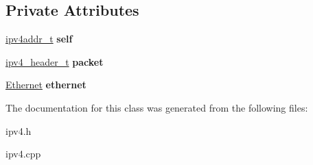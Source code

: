 \subsection*{Private Attributes}
\begin{DoxyCompactItemize}
\item 
\mbox{\label{classIPv4_a4288e410994ae3a739dc7e2a6aedeb90}} 
\mbox{\hyperlink{unionipv4addr__t}{ipv4addr\+\_\+t}} {\bfseries self}
\item 
\mbox{\label{classIPv4_abc94da213c7f9b909a96821315230fbc}} 
\mbox{\hyperlink{structipv4__header__t}{ipv4\+\_\+header\+\_\+t}} {\bfseries packet}
\item 
\mbox{\label{classIPv4_a0cded8cd68cb45095673e91d3739a15c}} 
\mbox{\hyperlink{classEthernet}{Ethernet}} {\bfseries ethernet}
\end{DoxyCompactItemize}


The documentation for this class was generated from the following files\+:\begin{DoxyCompactItemize}
\item 
ipv4.\+h\item 
ipv4.\+cpp\end{DoxyCompactItemize}
